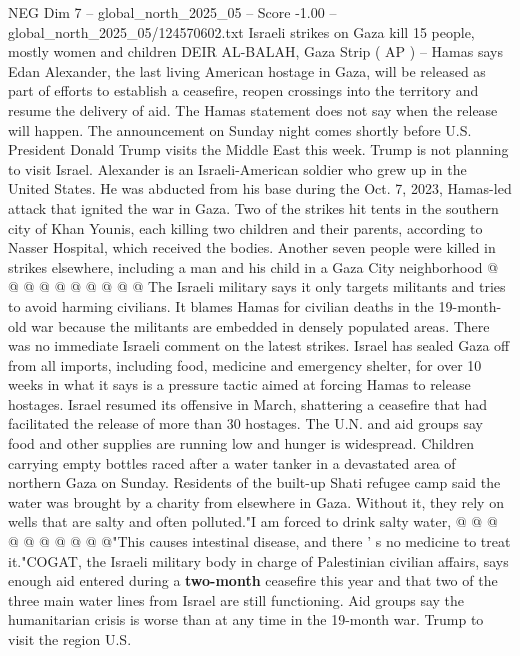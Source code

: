 \begin{textsample}{NEG Dim 7 – global\_north\_2025\_05 – Score -1.00 – global\_north\_2025\_05/124570602.txt}  \label{ex:f7_neg_128}
Israeli strikes on Gaza kill 15 people, mostly women and children DEIR AL-BALAH, Gaza Strip ( AP ) -- Hamas says Edan Alexander, the last living American hostage in Gaza, will be released as part of efforts to establish a ceasefire, reopen crossings into the territory and resume the delivery of aid.
The Hamas statement does not say when the release will happen.
The announcement on Sunday night comes shortly before U.S.
President Donald Trump visits the Middle East this week.
Trump is not planning to visit Israel.
Alexander is an Israeli-American soldier who grew up in the United States.
He was abducted from his base during the Oct. 7, 2023, Hamas-led attack that ignited the war in Gaza.
Two of the strikes hit tents in the southern city of Khan Younis, each killing two children and their parents, according to Nasser Hospital, which received the bodies.
Another seven people were killed in strikes elsewhere, including a man and his child in a Gaza City neighborhood @ @ @ @ @ @ @ @ @ @ The Israeli military says it only targets militants and tries to avoid harming civilians.
It blames Hamas for civilian deaths in the 19-month-old war because the militants are embedded in densely populated areas.
There was no immediate Israeli comment on the latest strikes.
Israel has sealed Gaza off from all imports, including food, medicine and emergency shelter, for over 10 weeks in what it says is a pressure tactic aimed at forcing Hamas to release hostages.
Israel resumed its offensive in March, shattering a ceasefire that had facilitated the release of more than 30 hostages.
The U.N. and aid groups say food and other supplies are running low and hunger is widespread.
Children carrying empty bottles raced after a water tanker in a devastated area of northern Gaza on Sunday.
Residents of the built-up Shati refugee camp said the water was brought by a charity from elsewhere in Gaza.
Without it, they rely on wells that are salty and often polluted."I am forced to drink salty water, @ @ @ @ @ @ @ @ @ @"This causes intestinal disease, and there ' s no medicine to treat it."COGAT, the Israeli military body in charge of Palestinian civilian affairs, says enough aid entered during a \textbf{two-month} ceasefire this year and that two of the three main water lines from Israel are still functioning.
Aid groups say the humanitarian crisis is worse than at any time in the 19-month war.
Trump to visit the region U.S.

\end{textsample}
